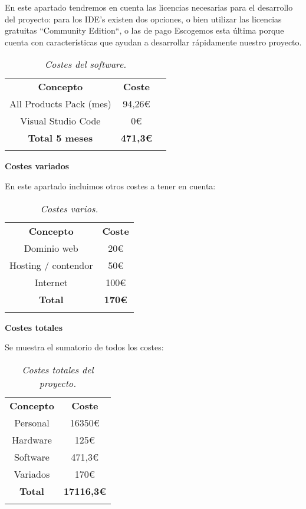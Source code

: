 En este apartado tendremos en cuenta las licencias necesarias para el desarrollo del proyecto: para los IDE's existen
dos opciones, o bien utilizar las licencias gratuitas ``Community Edition``, o las de pago\cite{jetbrainsPrecios}
Escogemos esta última porque cuenta con características que ayudan a desarrollar rápidamente nuestro proyecto.

\begin{table}[H]
    \centering
    \begin{tabular}{| c | c | c |}\hline
        \Xhline{2\arrayrulewidth}
        \textbf{Concepto} & \textbf{Coste} \\ \Xhline{2\arrayrulewidth}
        All Products Pack (mes) & 94,26€ \\ \hline
        Visual Studio Code & 0€ \\ \hline
        \Xhline{2\arrayrulewidth}
        \textbf{Total 5 meses} & \textbf{471,3€} \\ \Xhline{2\arrayrulewidth}
    \end{tabular}
    \caption{\textit{Costes del software.}}
\end{table}

\textbf{Costes variados}

En este apartado incluimos otros costes a tener en cuenta:


\begin{table}[H]
    \centering
    \begin{tabular}{| c | c |}\hline
        \Xhline{2\arrayrulewidth}
        \textbf{Concepto} & \textbf{Coste} \\ \Xhline{2\arrayrulewidth}
        Dominio web & 20€ \\ \hline
        Hosting / contendor & 50€\\ \hline
        Internet & 100€ \\ \hline
        \Xhline{2\arrayrulewidth}
        \textbf{Total} & \textbf{170€} \\ \Xhline{2\arrayrulewidth}
    \end{tabular}
    \caption{\textit{Costes varios.}}
\end{table}

\textbf{Costes totales}

Se muestra el sumatorio de todos los costes:

\begin{table}[H]
    \centering
    \begin{tabular}{| c | c |}\hline
        \Xhline{2\arrayrulewidth}
        \textbf{Concepto} & \textbf{Coste} \\ \Xhline{2\arrayrulewidth}
        Personal & 16350€ \\ \hline
        Hardware & 125€\\ \hline
        Software & 471,3€ \\ \hline
        Variados & 170€ \\ \hline
        \Xhline{2\arrayrulewidth}
        \textbf{Total} & \textbf{17116,3€} \\ \Xhline{2\arrayrulewidth}
    \end{tabular}
    \caption{\textit{Costes totales del proyecto.}}
\end{table}

